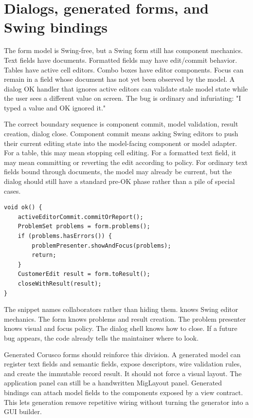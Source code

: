 \section{Dialogs, generated forms, and Swing bindings}

The form model is Swing-free, but a Swing form still has component mechanics.
Text fields have documents. Formatted fields may have edit/commit behavior.
Tables have active cell editors. Combo boxes have editor components. Focus can
remain in a field whose document has not yet been observed by the model. A
dialog OK handler that ignores active editors can validate stale model state
while the user sees a different value on screen. The bug is ordinary and
infuriating: "I typed a value and OK ignored it."

The correct boundary sequence is component commit, model validation, result
creation, dialog close. Component commit means asking Swing editors to push
their current editing state into the model-facing component or model adapter.
For a table, this may mean stopping cell editing. For a formatted text field,
it may mean committing or reverting the edit according to policy. For ordinary
text fields bound through documents, the model may already be current, but the
dialog should still have a standard pre-OK phase rather than a pile of special
cases.

\begin{lstlisting}[caption={A dialog OK sequence as a reusable protocol.}]
void ok() {
    activeEditorCommit.commitOrReport();
    ProblemSet problems = form.problems();
    if (problems.hasErrors()) {
        problemPresenter.showAndFocus(problems);
        return;
    }
    CustomerEdit result = form.toResult();
    closeWithResult(result);
}
\end{lstlisting}

The snippet names collaborators rather than hiding them. 
knows Swing editor mechanics. The form knows problems and result creation. The
problem presenter knows visual and focus policy. The dialog shell knows how to
close. If a future bug appears, the code already tells the maintainer where to
look.

Generated Corusco forms should reinforce this division. A generated
 model can register text fields and semantic fields, expose
descriptors, wire validation rules, and create the immutable record result. It
should not force a visual layout. The application panel can still be a
handwritten MigLayout panel. Generated bindings can attach model fields to the
components exposed by a view contract. This lets generation remove repetitive
wiring without turning the generator into a GUI builder.

